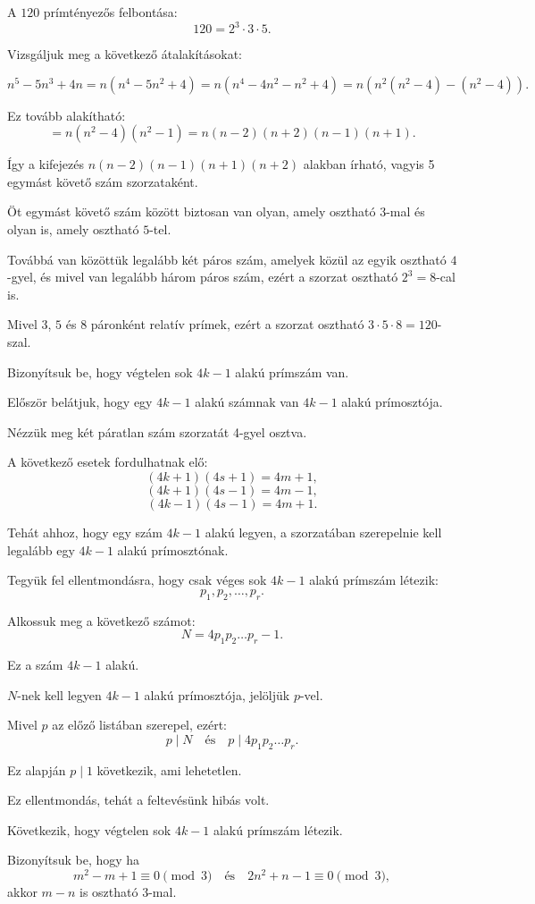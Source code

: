 \begin{solution}
A $120$ prímtényezős felbontása: 
\[
120=2^{3}\cdot3\cdot5.
\]

Vizsgáljuk meg a következő átalakításokat:

\[
n^{5}-5n^{3}+4n=n(n^{4}-5n^{2}+4)=n(n^{4}-4n^{2}-n^{2}+4)=n(n^{2}(n^{2}-4)-(n^{2}-4)).
\]

Ez tovább alakítható: 
\[
=n(n^{2}-4)(n^{2}-1)=n(n-2)(n+2)(n-1)(n+1).
\]

Így a kifejezés $n(n-2)(n-1)(n+1)(n+2)$ alakban írható, vagyis 5
egymást követő szám szorzataként.

Öt egymást követő szám között biztosan van olyan, amely osztható $3$-mal
és olyan is, amely osztható $5$-tel.

Továbbá van közöttük legalább két páros szám, amelyek közül az egyik
osztható $4$-gyel, és mivel van legalább három páros szám, ezért
a szorzat osztható $2^{3}=8$-cal is.

Mivel $3$, $5$ és $8$ páronként relatív prímek, ezért a szorzat
osztható $3\cdot5\cdot8=120$-szal. 
\end{solution}
\begin{problem}
Bizonyítsuk be, hogy végtelen sok $4k-1$ alakú prímszám van. 
\end{problem}

\begin{solution}
Először belátjuk, hogy egy $4k-1$ alakú számnak van $4k-1$ alakú
prímosztója.

Nézzük meg két páratlan szám szorzatát 4-gyel osztva.

A következő esetek fordulhatnak elő: 
\[
(4k+1)(4s+1)=4m+1,
\]
\[
(4k+1)(4s-1)=4m-1,
\]
\[
(4k-1)(4s-1)=4m+1.
\]

Tehát ahhoz, hogy egy szám $4k-1$ alakú legyen, a szorzatában szerepelnie
kell legalább egy $4k-1$ alakú prímosztónak.

\vspace{1em}

Tegyük fel ellentmondásra, hogy csak véges sok $4k-1$ alakú prímszám
létezik: 
\[
p_{1},p_{2},\dots,p_{r}.
\]

Alkossuk meg a következő számot: 
\[
N=4p_{1}p_{2}\dots p_{r}-1.\tag{1}
\]

Ez a szám $4k-1$ alakú.

$N$-nek kell legyen $4k-1$ alakú prímosztója, jelöljük $p$-vel.

Mivel $p$ az előző listában szerepel, ezért: 
\[
p\mid N\quad\text{és}\quad p\mid4p_{1}p_{2}\dots p_{r}.
\]

Ez alapján $p\mid1$ következik, ami lehetetlen.

\vspace{1em}

Ez ellentmondás, tehát a feltevésünk hibás volt.

Következik, hogy végtelen sok $4k-1$ alakú prímszám létezik. 
\end{solution}
\begin{problem}
Bizonyítsuk be, hogy ha 
\[
m^{2}-m+1\equiv0\pmod 3\quad\text{és}\quad2n^{2}+n-1\equiv0\pmod 3,
\]
akkor $m-n$ is osztható 3-mal.
\end{problem}

